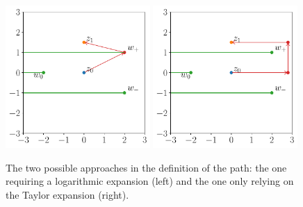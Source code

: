 \documentclass[final,1p,times]{elsarticle}
\begin{document}
\begin{figure}[t]
\includegraphics[width=0.49\textwidth]{path_log.pdf}
\includegraphics[width=0.49\textwidth]{path_taylor.pdf}
\caption{\label{fig:path_logVStaylor}
 The two possible approaches in the definition of the path: the one requiring a logarithmic expansion (left) and the one only relying on the Taylor expansion (right).}
\end{figure}
\end{document}
